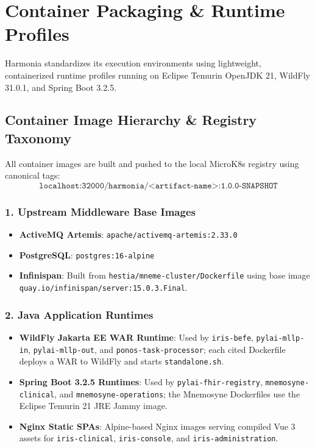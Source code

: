 
\chapter{Container Packaging \& Runtime Profiles}
\label{chap:container_runtime}

Harmonia standardizes its execution environments using lightweight, containerized runtime profiles running on Eclipse Temurin OpenJDK 21, WildFly 31.0.1, and Spring Boot 3.2.5.

\section{Container Image Hierarchy \& Registry Taxonomy}

All container images are built and pushed to the local MicroK8s registry using canonical tags:
\begin{equation*}
\texttt{localhost:32000/harmonia/<artifact-name>:1.0.0-SNAPSHOT}
\end{equation*}

\subsection{1. Upstream Middleware Base Images}
\begin{itemize}
    \item \textbf{ActiveMQ Artemis}: \texttt{apache/activemq-artemis:2.33.0}
    \item \textbf{PostgreSQL}: \texttt{postgres:16-alpine}
    \item \textbf{Infinispan}: Built from \texttt{hestia/mneme-cluster/Dockerfile} using base image \texttt{quay.io/infinispan/server:15.0.3.Final}.
\end{itemize}

\subsection{2. Java Application Runtimes}
\begin{itemize}
    \item \textbf{WildFly Jakarta EE WAR Runtime}: Used by \texttt{iris-befe}, \texttt{pylai-mllp-in}, \texttt{pylai-mllp-out}, and \nolinkurl{ponos-task-processor}; each cited Dockerfile deploys a WAR to WildFly and starts \texttt{standalone.sh}.
    \item \textbf{Spring Boot 3.2.5 Runtimes}: Used by \texttt{pylai-fhir-registry}, \texttt{mnemosyne-clinical}, and \texttt{mnemosyne-operations}; the Mnemosyne Dockerfiles use the Eclipse Temurin 21 JRE Jammy image.
    \item \textbf{Nginx Static SPAs}: Alpine-based Nginx images serving compiled Vue 3 assets for \texttt{iris-clinical}, \texttt{iris-console}, and \texttt{iris-administration}.
\end{itemize}

